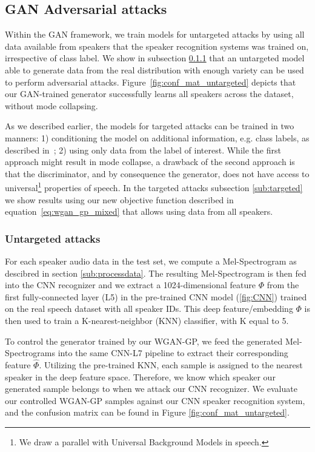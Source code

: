 \subsection{GAN Adversarial attacks}

Within the GAN framework, we train models for untargeted attacks by using all
data available from speakers that the speaker recognition systems was trained
on, irrespective of class label. We show in subsection \ref{sub:untargeted} that
an untargeted model able to generate data from the real distribution with enough
variety can be used to perform adversarial attacks.
Figure~\ref{fig:conf_mat_untargeted} depicts that our GAN-trained generator
successfully learns all speakers across the dataset, without mode collapsing.

As we described earlier, the models for targeted attacks can be trained in two
manners: 1) conditioning the model on additional information, e.g. class labels,
as described in~\cite{mirza2014conditional}; 2) using only data from the label
of interest. While the first approach might result in mode collapse, a drawback
of the second approach is that the discriminator, and by consequence the
generator, does not have access to universal\footnote{We draw a parallel with
Universal Background Models in speech.} properties of speech. In the targeted
attacks subsection \ref{sub:targeted} we show results using our new objective
function described in equation~\ref{eq:wgan_gp_mixed} that allows using data
from all speakers.  

\subsubsection{Untargeted attacks}\label{sub:untargeted}
For each speaker audio data in the test set, we compute a Mel-Spectrogram as
descibred in section \ref{sub:processdata}. The resulting Mel-Spectrogram is
then fed into the CNN recognizer and we extract a 1024-dimensional feature $\Phi$ from
the first fully-connected layer (L5) in the pre-trained CNN model
(\ref{fig:CNN}) trained on the real speech dataset with all speaker IDs. This
deep feature/embedding $\Phi$ is then used to train a K-nearest-neighbor (KNN)
classifier, with K equal to 5.

To control the generator trained by our WGAN-GP, we feed the generated
Mel-Spectrograms into the same CNN-L7 pipeline to extract their corresponding
feature $\widehat \Phi$. Utilizing the pre-trained KNN, each sample is assigned to
the nearest speaker in the deep feature space. Therefore, we know which speaker
our generated sample belongs to when we attack our CNN recognizer. We evaluate our
controlled WGAN-GP samples against our CNN speaker recognition system, and the
confusion matrix can be found in Figure \ref{fig:conf_mat_untargeted}. 

